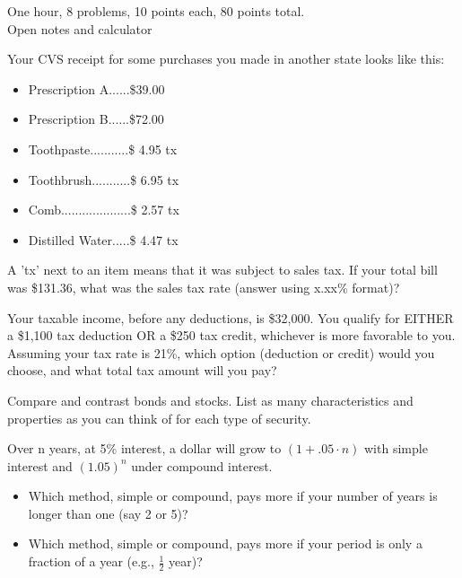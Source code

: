 \documentclass[12pt]{exam}
\begin{document}
\begin{flushleft}
    One hour, 8 problems, 10 points each, 80 points total. \\
    Open notes and calculator
\end{flushleft}

\begin{questions}
    \question Your CVS receipt for some purchases you made in another state looks like this:
    \begin{itemize}
        \item Prescription A......\$39.00
        \item Prescription B......\$72.00
        \item Toothpaste...........\$ 4.95    tx
        \item Toothbrush...........\$ 6.95    tx
        \item Comb....................\$ 2.57    tx
        \item Distilled Water.....\$ 4.47    tx
    \end{itemize}

    A 'tx' next to an item means that it was subject to sales tax.
    If your total bill was \$131.36, what was the sales tax rate (answer using x.xx\% format)?
    \vspace{1in}

    \question Your taxable income, before any deductions, is \$32,000.  You qualify for EITHER a
    \$1,100 tax deduction OR a \$250 tax credit, whichever is more favorable to you.  Assuming your
    tax rate is 21\%, which option (deduction or credit) would  you choose, and what total tax
    amount will you pay?
    \vspace{1in}

    \question Compare and contrast bonds and stocks.  List as many characteristics and properties
    as you can think of for each type of security.
    \vspace{1in}

    \question Over n years, at 5\% interest, a dollar will grow to $ (1+.05 \cdot n) $ with simple interest
    and $ (1.05)^n $ under compound interest.
    \begin{itemize}
        \item Which method, simple or compound, pays more if your number of
            years is longer than one (say 2 or 5)?
        \item Which method, simple or compound, pays more if your period is only
            a fraction of a year (e.g., $ \frac{1}{2} $ year)?
    \end{itemize}
    \vspace{1.5in}


\end{questions}
\end{document}
